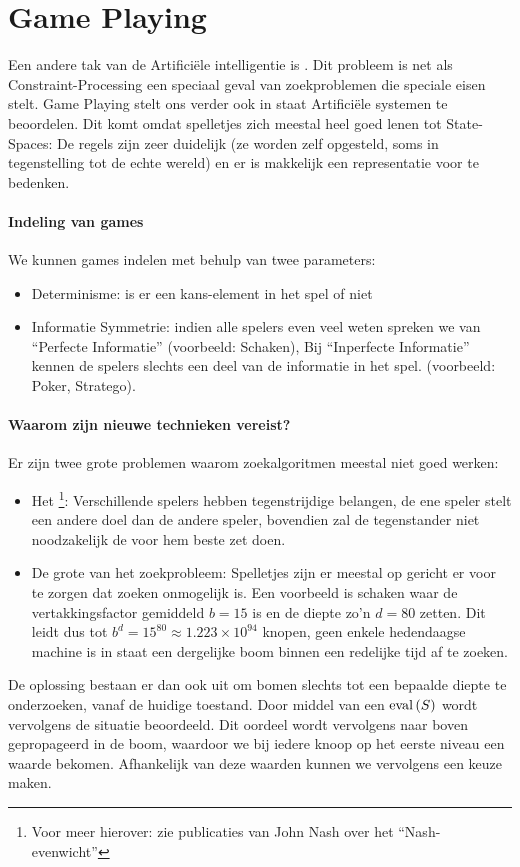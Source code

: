 \section{Game Playing}
\label{s:gamePlaying}
Een andere tak van de Artifici\"ele intelligentie is . Dit probleem is net als Constraint-Processing een speciaal geval van zoekproblemen die speciale eisen stelt. Game Playing stelt ons verder ook in staat Artifici\"ele systemen te beoordelen. Dit komt omdat spelletjes zich meestal heel goed lenen tot State-Spaces: De regels zijn zeer duidelijk (ze worden zelf opgesteld, soms in tegenstelling tot de echte wereld) en er is makkelijk een representatie voor te bedenken.
\paragraph{Indeling van games}
We kunnen games indelen met behulp van twee parameters:
\begin{itemize}
 \item Determinisme: is er een kans-element in het spel of niet
 \item Informatie Symmetrie: indien alle spelers even veel weten spreken we van ``Perfecte Informatie'' (voorbeeld: Schaken), Bij ``Inperfecte Informatie'' kennen de spelers slechts een deel van de informatie in het spel. (voorbeeld: Poker, Stratego).
\end{itemize}
\paragraph{Waarom zijn nieuwe technieken vereist?}
Er zijn twee grote problemen waarom zoekalgoritmen meestal niet goed werken:
\begin{itemize}
 \item Het \footnote{Voor meer hierover: zie publicaties van John Nash over het ``Nash-evenwicht''}: Verschillende spelers hebben tegenstrijdige belangen, de ene speler stelt een andere doel dan de andere speler, bovendien zal de tegenstander niet noodzakelijk de voor hem beste zet doen.
 \item De grote van het zoekprobleem: Spelletjes zijn er meestal op gericht er voor te zorgen dat zoeken onmogelijk is. Een voorbeeld is schaken waar de vertakkingsfactor gemiddeld $b=15$ is en de diepte zo'n $d=80$ zetten. Dit leidt dus tot $b^d=15^{80}\approx1.223\times10^{94}$ knopen, geen enkele hedendaagse machine is in staat een dergelijke boom binnen een redelijke tijd af te zoeken.
\end{itemize}
De oplossing bestaan er dan ook uit om bomen slechts tot een bepaalde diepte te onderzoeken, vanaf de huidige toestand. Door middel van een  $\mbox{eval}\left( S \right)$ wordt vervolgens de situatie beoordeeld. Dit oordeel wordt vervolgens naar boven gepropageerd in de boom, waardoor we bij iedere knoop op het eerste niveau een waarde bekomen. Afhankelijk van deze waarden kunnen we vervolgens een keuze maken.
